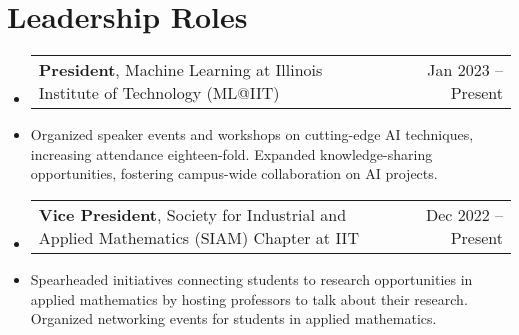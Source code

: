 \documentclass[letterpaper,10pt]{article}
\makeatletter
\newcommand{\resumeItem}[1]{
  \item\small{
    {#1 \vspace{-2pt}}
  }
}
\newcommand{\resumeSubSubheading}[2]{
    \item \normalsize
    \begin{tabular*}{0.97\textwidth}{l@{\extracolsep{\fill}}r}
      #1 & #2 \\
    \end{tabular*}\vspace{-7pt}
}
\newcommand{\resumeSubHeadingListStart}{\begin{itemize}[leftmargin=0.15in, label=]}
\newcommand{\resumeSubHeadingListEnd}{\end{itemize}}
\makeatother
\begin{document}
\section{Leadership Roles}
\resumeSubHeadingListStart
    \resumeSubSubheading{\textbf{President}, Machine Learning at Illinois Institute of Technology (ML@IIT)}{Jan 2023 -- Present}
    \resumeItem{Organized speaker events and workshops on cutting-edge AI techniques, increasing attendance eighteen-fold. Expanded knowledge-sharing opportunities, fostering campus-wide collaboration on AI projects.}
    \resumeSubSubheading{\textbf{Vice President}, Society for Industrial and Applied Mathematics (SIAM) Chapter at IIT}{Dec 2022 -- Present}
    \resumeItem{Spearheaded initiatives connecting students to research opportunities in applied mathematics by hosting professors to talk about their research. Organized networking events for students in applied mathematics.}
\resumeSubHeadingListEnd


\end{document}
